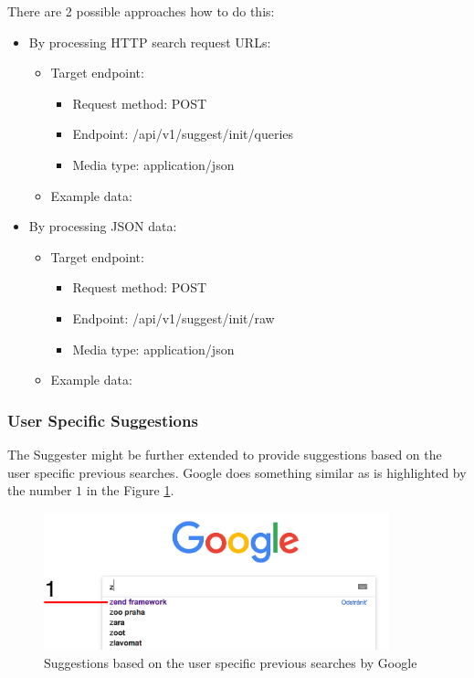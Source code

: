 There are 2 possible approaches how to do this:
\begin{itemize}
    \item By processing HTTP search request URLs:
        \begin{itemize}
            \item Target endpoint:
            \begin{itemize}
                \item Request method: POST
                \item Endpoint: /api/v1/suggest/init/queries
                \item Media type: application/json
            \end{itemize}
            \item Example data:
\begin{code}
["http://demo.opengrok.org/search?project=opengrok\&q=test"]
\end{code}
        \end{itemize}
    \item By processing JSON data:
        \begin{itemize}
            \item Target endpoint:
            \begin{itemize}
                \item Request method: POST
                \item Endpoint: /api/v1/suggest/init/raw
                \item Media type: application/json
            \end{itemize}
            \item Example data:
\begin{code}
\end{code}
        \end{itemize}
\end{itemize}

\subsubsection{User Specific Suggestions}
The Suggester might be further extended to provide suggestions based on the user specific previous searches. Google does
something similar as is highlighted by the number $1$ in the Figure \ref{google_previous}.
\begin{figure}[htbp]
    \centering
    \includegraphics[width=100mm]{../img/google_previous.png}
    \caption{Suggestions based on the user specific previous searches by Google}
    \label{google_previous}
\end{figure}

